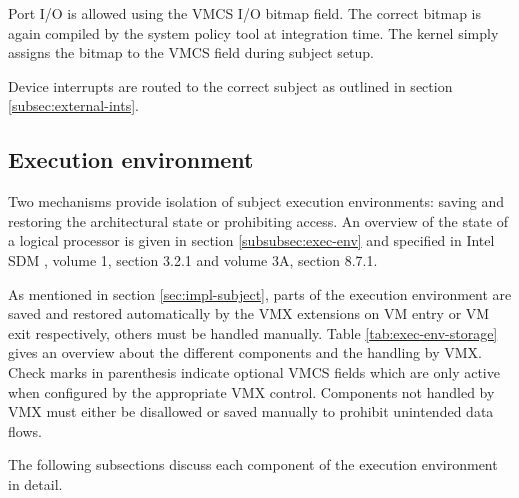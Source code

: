 Port I/O is allowed using the VMCS I/O bitmap field. The correct bitmap is again
compiled by the system policy tool at integration time. The kernel simply assigns
the bitmap to the VMCS field during subject setup.

Device interrupts are routed to the correct subject as outlined in section
\ref{subsec:external-ints}.

\subsection{Execution environment}\label{subsec:exec-env-sep}
Two mechanisms provide isolation of subject execution environments: saving and
restoring the architectural state or prohibiting access. An overview of the
state of a logical processor is given in section \ref{subsubsec:exec-env} and
specified in Intel SDM \cite{IntelSDM}, volume 1, section 3.2.1 and volume 3A,
section 8.7.1.

As mentioned in section \ref{sec:impl-subject}, parts of the execution
environment are saved and restored automatically by the VMX extensions on VM
entry or VM exit respectively, others must be handled manually. Table
\ref{tab:exec-env-storage} gives an overview about the different components and
the handling by VMX. Check marks in parenthesis indicate optional VMCS fields
which are only active when configured by the appropriate VMX control.
Components not handled by VMX must either be disallowed or saved manually to
prohibit unintended data flows.

The following subsections discuss each component of the execution environment in
detail.


